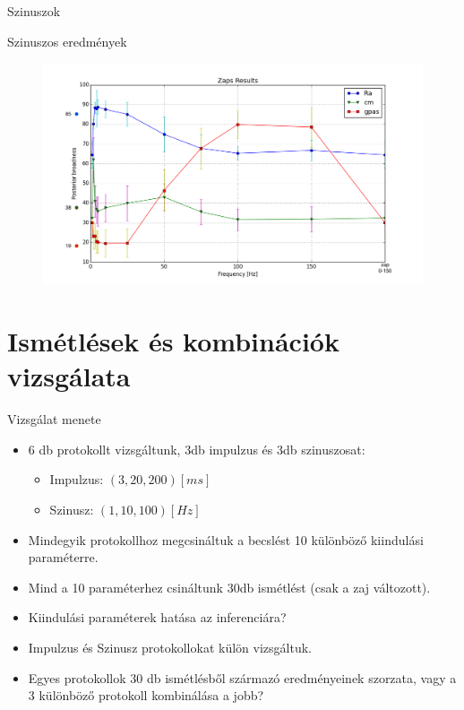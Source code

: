 \documentclass{beamer}
\begin{document}
\begin{darkframes}
\begin{frame}
\begin{center}
	\Large \alert{Szinuszok}
\end{center}
\end{frame}

	\begin{frame}{Szinuszos eredmények}
	\begin{figure}
		\centering
		\includegraphics[width=\textwidth]{steps/zaps_broadness.png}
	\end{figure}
	\end{frame}

\section{Ismétlések és kombinációk vizsgálata}

\begin{frame}{Vizsgálat menete}
\begin{itemize}
	\item<1-> 6 db protokollt vizsgáltunk, 3db impulzus és 3db szinuszosat:
	\begin{itemize}
		\item<1-> Impulzus: $\left(3, 20, 200\right)\left[ms\right]$
		\item<1-> Szinusz: $\left(1, 10, 100\right)\left[Hz\right]$
	\end{itemize}
	\item<2-> Mindegyik protokollhoz megcsináltuk a becslést 10 különböző kiindulási paraméterre.
	\item<3-> Mind a 10 paraméterhez csináltunk 30db ismétlést (csak a zaj változott).
	\item<4-> Kiindulási paraméterek hatása az inferenciára?
	\item<5-> Impulzus és Szinusz protokollokat külön vizsgáltuk.
	\item<6-> Egyes protokollok 30 db ismétlésből származó eredményeinek szorzata, vagy a 3 különböző protokoll kombinálása a jobb?
	

\end{itemize}
\end{frame}
\end{darkframes}
\end{document}
